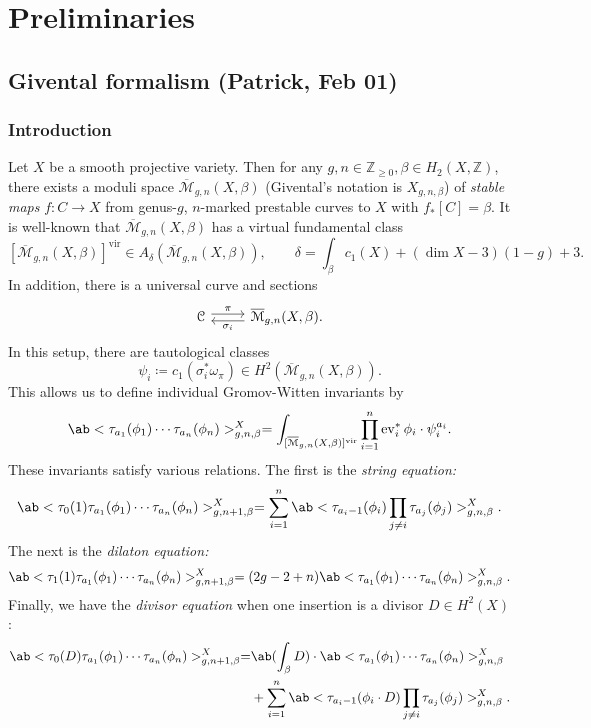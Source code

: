 \documentclass[leqno, openany]{memoir}
\theoremstyle{definition}
\theoremstyle{remark}
\theoremstyle{plain}
\theoremstyle{definition}
\theoremstyle{remark}
\newcommand{\Z}{\mathbb{Z}}
\newcommand{\mc}[1]{\mathcal{#1}}
\newcommand{\mr}[1]{\mathrm{#1}}
\newcommand{\on}[1]{\operatorname{#1}}
\newcommand{\Mbar}{\overline{\mathcal{M}}}
\begin{document}
\newpage

\tableofcontents

\chapter{Preliminaries}%
\label{cha:Preliminaries}

\section{Givental formalism (Patrick, Feb 01)}
\label{sec:Givental}

\subsection{Introduction}

Let $X$ be a smooth projective variety. Then for any $g,n \in \Z_{\geq 0}, \beta \in H_2(X,\Z)$, there exists a moduli space $\Mbar_{g,n}(X,\beta)$ (Givental's notation is $X_{g,n,\beta}$) of \textit{stable maps} $f \colon C \to X$ from genus-$g$, $n$-marked prestable curves to $X$ with $f_*[C] = \beta$. It is well-known that $\Mbar_{g,n}(X,\beta)$ has a virtual fundamental class
\[ [\Mbar_{g,n}(X,\beta)]^{\mr{vir}} \in A_{\delta}(\Mbar_{g,n}(X,\beta)), \qquad \delta = \int_{\beta} c_1(X) + (\dim X - 3)(1-g) + 3. \]
In addition, there is a universal curve and sections
\begin{equation*}
\begin{tikzcd}
    \mc{C} \ar[shift left=1]{r}{\pi} & \Mbar_{g,n}(X,\beta) \ar[shift left=1]{l}{\sigma_i}.
\end{tikzcd}
\end{equation*}
In this setup, there are tautological classes
\[ \psi_i \coloneqq c_1(\sigma_i^* \omega_{\pi}) \in H^2(\Mbar_{g,n}(X,\beta)). \]
This allows us to define individual Gromov-Witten invariants by
\[ \ab<\tau_{a_1}(\phi_1) \cdots \tau_{a_n}(\phi_n)>_{g,n,\beta}^X = \int_{[\Mbar_{g,n}(X,\beta)]^{\mr{vir}}} \prod_{i=1}^n \on{ev}_i^* \phi_i \cdot \psi_i^{a_i}. \]
These invariants satisfy various relations. The first is the \textit{string equation:}
\[ \ab<\tau_0(1) \tau_{a_1}(\phi_1) \cdots \tau_{a_n}(\phi_n)>_{g,n+1,\beta}^X = \sum_{i=1}^n \ab<\tau_{a_i-1}(\phi_i)\prod_{j\neq i} \tau_{a_j}(\phi_j)>_{g,n,\beta}^X. \]
The next is the \textit{dilaton equation:}
\[ \ab<\tau_1(1) \tau_{a_1}(\phi_1) \cdots \tau_{a_n}(\phi_n)>_{g,n+1,\beta}^X = (2g-2+n)\ab<\tau_{a_1}(\phi_1) \cdots \tau_{a_n}(\phi_n)>_{g,n,\beta}^X. \]
Finally, we have the \textit{divisor equation} when one insertion is a divisor $D \in H^2(X)$:
\begin{align*}
    \ab<\tau_0(D)\tau_{a_1}(\phi_1)\cdots \tau_{a_n}(\phi_n)>_{g,n+1,\beta}^X =&{} \ab(\int_{\beta} D) \cdot \ab<\tau_{a_1}(\phi_1) \cdots \tau_{a_n}(\phi_n)>_{g,n,\beta}^X \\
    &+ \sum_{i=1}^n \ab<\tau_{a_i-1}(\phi_i \cdot D)\prod_{j\neq i} \tau_{a_j}(\phi_j)>_{g,n,\beta}^X.
\end{align*}
\end{document}
